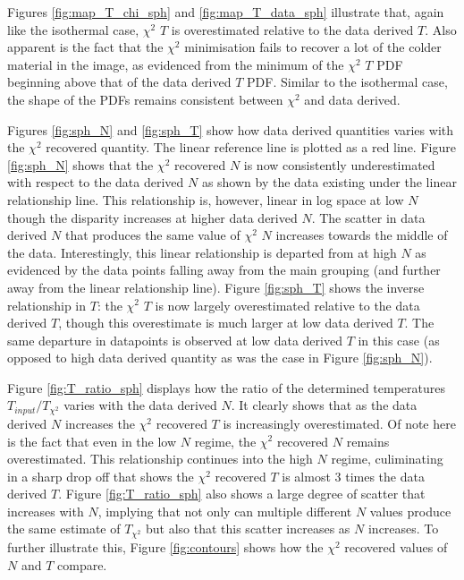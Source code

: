 \documentclass{report}
\begin{document}
Figures \ref{fig:map_T_chi_sph} and \ref{fig:map_T_data_sph} illustrate that, again like the isothermal case, $\chi^{2}$ $T$ is overestimated relative to the data derived $T$. Also apparent is the fact that the $\chi^{2}$ minimisation fails to recover a lot of the colder material in the image, as evidenced from the minimum of the $\chi^{2}$ $T$ PDF beginning above that of the data derived $T$ PDF. Similar to the isothermal case, the shape of the PDFs remains consistent between $\chi^{2}$ and data derived.

Figures \ref{fig:sph_N} and \ref{fig:sph_T} show how data derived quantities varies with the $\chi^{2}$ recovered quantity. The linear reference line is plotted as a red line. Figure \ref{fig:sph_N} shows that the $\chi^{2}$ recovered $N$ is now consistently underestimated with respect to the data derived $N$ as shown by the data existing under the linear relationship line. This relationship is, however, linear in log space at low $N$ though the disparity increases at higher data derived $N$. The scatter in data derived $N$ that produces the same value of $\chi^{2}$ $N$ increases towards the middle of the data. Interestingly, this linear relationship is departed from at high $N$ as evidenced by the data points falling away from the main grouping (and further away from the linear relationship line). Figure \ref{fig:sph_T} shows the inverse relationship in
$T$: the $\chi^{2}$ $T$ is now largely overestimated relative to the data derived $T$, though this overestimate is much larger at low data derived $T$. The same departure in datapoints is observed at low data derived $T$ in this case (as opposed to high data derived quantity as was the case in Figure \ref{fig:sph_N}).

Figure \ref{fig:T_ratio_sph} displays how the ratio of the determined temperatures $T_{input}/T_{\chi^{2}}$ varies with the data derived $N$. It clearly shows that as the data derived $N$ increases the $\chi^{2}$ recovered $T$ is increasingly overestimated. Of note here is the fact that even in the low $N$ regime, the $\chi^{2}$ recovered $N$ remains overestimated. This relationship continues into the high $N$ regime, culiminating in a sharp drop off that shows the $\chi^{2}$ recovered $T$ is almost 3 times the data derived $T$.
Figure \ref{fig:T_ratio_sph} also shows a large degree of scatter that increases with $N$, implying that not only can multiple different $N$ values produce the same estimate of $T_{\chi^{2}}$ but also that this scatter increases as $N$ increases. To further illustrate this, Figure \ref{fig:contours} shows how the $\chi^{2}$ recovered values of $N$ and $T$ compare.
\end{document}
